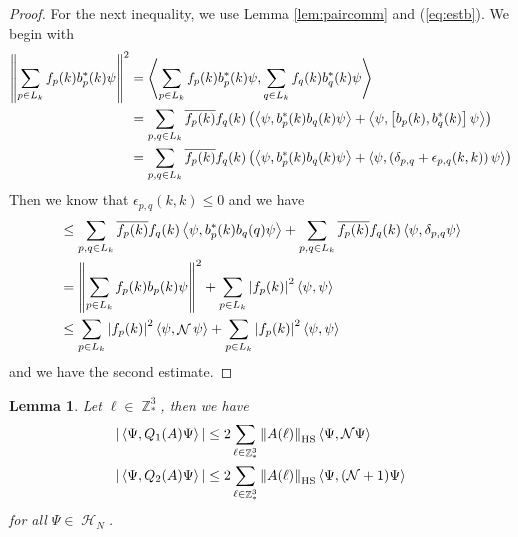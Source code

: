 \documentclass[sn-mathphys, Numbered ,a4paper]{sn-jnl}%
\DeclareMathOperator{\Z}{\mathbb{Z}}
\DeclareMathOperator{\HH}{\mathcal{H}}
\DeclareMathOperator{\NN}{\mathcal{N}}
\newcommand{\eva}[1]{\left\langle #1 \right\rangle}
\theoremstyle{plain}
\newtheorem{lemma}[theorem]{Lemma}
\theoremstyle{definition}
\theoremstyle{remark}
\theoremstyle{plain}
\theoremstyle{definition}
\theoremstyle{remark}
\begin{document}
\begin{proof}
    For the next inequality, we use Lemma \ref{lem:paircomm} and (\ref{eq:estb}). We begin with
    \begin{align}
        \norm{\sum\limits_{p\in L_k}f_p(k)b^*_p(k)\psi}^2 &= \eva{\sum\limits_{p\in L_k}f_p(k)b^*_p(k)\psi,\sum\limits_{q\in L_k}f_q(k)b^*_q(k)\psi}\nonumber\\
        &= \sum\limits_{p,q \in L_k} \overline{f_p(k)}f_q(k)\left( \eva{\psi,b^*_p(k)b_q(k)\psi} + \eva{\psi, \left[ b_p(k),b^*_q(k)\right]\psi}\right) \nonumber\\
        &=\sum\limits_{p,q \in L_k} \overline{f_p(k)}f_q(k)\left( \eva{\psi,b^*_p(k)b_q(k)\psi} + \eva{\psi, \left( \delta_{p,q} + \epsilon_{p,q} (k,k) \right)\psi}\right)
    \end{align}
    Then we know that $\epsilon_{p,q}(k,k)\leq 0$ and we have
    \begin{align}
        &\leq \sum\limits_{p,q \in L_k} \overline{f_p(k)}f_q(k) \eva{\psi,b^*_p(k)b_q(q)\psi} + \sum\limits_{p,q \in L_k} \overline{f_p(k)}f_q(k)\eva{\psi, \delta_{p,q}\psi}\nonumber\\
        &=  \norm{\sum\limits_{p\in L_k}f_p(k)b_p(k)\psi}^2 + \sum\limits_{p \in L_k} \abs{f_p(k)}^2 \eva{\psi, \psi}\nonumber\\
        &\leq \sum\limits_{p \in L_k} \abs{f_p(k)}^2 \eva{\psi, \NN \psi} + \sum\limits_{p \in L_k} \abs{f_p(k)}^2 \eva{\psi, \psi}
    \end{align}
    and we have the second estimate.
\end{proof}
\begin{lemma}\label{lem:estQ2}
    Let $\ell \in \Z^3_*$, then we have
    \begin{align}
        |\eva{\Psi,Q_1(A)\Psi}| &\leq 2\sum\limits_{\ell\in \Z^3_*}\norm{A(\ell)}_{\mathrm{HS}}\eva{\Psi,\mathcal{N} \Psi}\label{eq:Q1est}\\
        |\eva{\Psi,Q_2(A)\Psi}| &\leq 2\sum\limits_{\ell\in \Z^3_*}\norm{A(\ell)}_{\mathrm{HS}}\eva{\Psi,(\mathcal{N}+1) \Psi}\label{eq:Q2est}
    \end{align}
    for all $\Psi \in \HH_N$.
\end{lemma}
\end{document}
